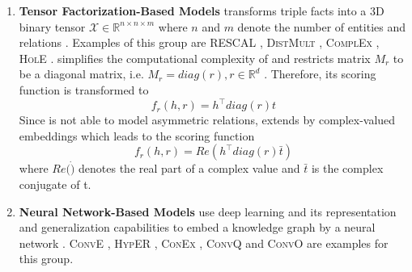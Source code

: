 \begin{enumerate}
    \item 
    \textbf{Tensor Factorization-Based Models} transforms triple facts into a 3D binary tensor $\mathcal{X} \in \mathbb{R}^{n \times n \times m}$ where $n$ and $m$ denote the number of entities and relations \cite{electronics9050750}.
    Examples of this group are \textsc{RESCAL} \cite{RESCAL}, \textsc{DistMult} \cite{DistMult}, \textsc{ComplEx} \cite{ComplEx}, \textsc{HolE} \cite{HolE}.
    \distmult \cite{DistMult} simplifies the computational complexity of \rescal and restricts matrix $M_r$ to be a diagonal matrix, i.e. $M_r = diag(r), r \in \mathbb{R}^d$ \cite{electronics9050750}. 
    Therefore, its scoring function is transformed to
    \begin{equation}
        f_r(h,r) = h^{\top}diag(r)t\label{eq:distmultscoringfunction}
    \end{equation}
    Since \distmult is not able to model asymmetric relations, \complex \cite{ComplEx} extends \distmult by complex-valued embeddings \cite{electronics9050750} which leads to the scoring function
    \begin{equation}
        f_r(h,r) = Re(h^{\top}diag(r)\bar{t})
        \label{eq:complexscoringfunction}
    \end{equation}
    where $Re(\dot)$ denotes the real part of a complex value and $\bar{t}$ is the complex conjugate of t.
    
    \item 
    \textbf{Neural Network-Based Models} use deep learning and its representation and generalization capabilities to embed a knowledge graph by a neural network \cite{electronics9050750}.
    \textsc{ConvE} \cite{ConvE}, \textsc{HypER} \cite{HypER}, \textsc{ConEx} \cite{ConEx}, \textsc{ConvQ} and  \textsc{ConvO} \cite{demir2021convolutional} are examples for this group.
    
\end{enumerate}
